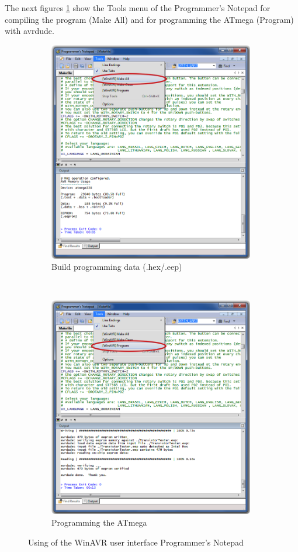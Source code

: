 The next figures \ref{fig:WinAVR2} show the Tools menu of the Programmer's Notepad
for compiling the program (Make All) and for programming the ATmega (Program) with avrdude.

\begin{figure}[H]
  \begin{subfigure}[b]{9cm}
    \centering
    \includegraphics[width=9cm]{../PNG/Notepad_make.png}
    \caption{Build programming data (.hex/.eep)}
  \end{subfigure}
  ~
  \begin{subfigure}[b]{9cm}
    \centering
    \includegraphics[width=9cm]{../PNG/Notepad_program.png}
    \caption{Programming the ATmega}
  \end{subfigure}
  \caption{Using of the WinAVR user interface Programmer's Notepad}
  \label{fig:WinAVR2}
\end{figure}



